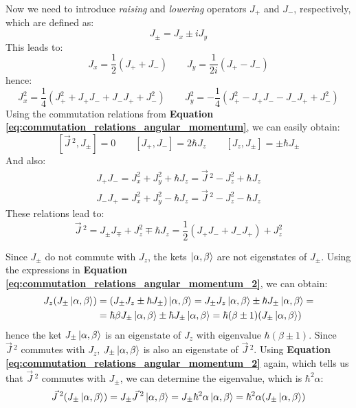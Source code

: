 Now we need to introduce \textit{raising} and \textit{lowering} operators $J_+$ and $J_-$, respectively, which are defined as:
\begin{equation}
    J_\pm = J_x \pm iJ_y
\end{equation}
This leads to:
\begin{equation} \label{eq:jx_and_jy_in_terms_of_jp_and_jm}
    J_x = \frac12(J_+ + J_-)\qquad J_y = \frac{1}{2i}(J_+ - J_-)
\end{equation}
hence:
\begin{equation}
    J_x^2 = \frac14(J_+^2+J_+J_-+J_-J_++J_-^2)\qquad J_y^2 = -\frac{1}{4}(J_+^2-J_+J_--J_-J_++J_-^2)
\end{equation}
Using the commutation relations from \textbf{Equation \ref{eq:commutation_relations_angular_momentum}}, we can easily obtain:
\begin{equation} \label{eq:commutation_relations_angular_momentum_2}
    [\vec{J}\,^2, J_\pm] = 0\qquad [J_+, J_-] = 2\hbar J_z \qquad [J_z, J_\pm] = \pm\hbar J_\pm
\end{equation}
And also:
\begin{equation} \label{j_p_and_j_m_products}
    \begin{split}
        J_+J_- = J_x^2 + J_y^2 + \hbar J_z = \vec{J}\,^2 - J_z^2 + \hbar J_z\\
        J_-J_+ = J_x^2 + J_y^2 - \hbar J_z = \vec{J}\,^2 - J_z^2 - \hbar J_z
    \end{split} 
\end{equation}
These relations lead to:
\begin{equation}
    \vec{J}\,^2 = J_\pm J_\mp + J_z^2 \mp \hbar J_z = \frac12(J_+ J_- + J_- J_+) + J_z^2
\end{equation}

Since $J_\pm$ do not commute with $J_z$, the kets $\ket{\alpha, \beta}$ are not eigenstates of $J_\pm$. Using the expressions in \textbf{Equation \ref{eq:commutation_relations_angular_momentum_2}}, we can obtain:
\begin{equation} \label{eq:jz_jpm_eigenstates}
    \begin{split}
        J_z(J_\pm\ket{\alpha, \beta}) &= (J_\pm J_z \pm \hbar J_\pm)\ket{\alpha, \beta} = J_\pm J_z \ket{\alpha, \beta} \pm \hbar J_\pm \ket{\alpha, \beta} = \\
        &= \hbar \beta J_\pm \ket{\alpha, \beta} \pm \hbar J_\pm \ket{\alpha, \beta} = \hbar(\beta \pm 1)(J_\pm\ket{\alpha, \beta})
    \end{split}
\end{equation} 
hence the ket $J_\pm\ket{\alpha, \beta}$ is an eigenstate of $J_z$ with eigenvalue $\hbar(\beta \pm 1)$. Since $\vec{J}\,^2$ commutes with $J_z$, $J_\pm\ket{\alpha, \beta}$ is also an eigenstate of $\vec{J}\,^2$. Using \textbf{Equation \ref{eq:commutation_relations_angular_momentum_2}} again, which tells us that $\vec{J}\,^2$ commutes with $J_\pm$, we can determine the eigenvalue, which is $\hbar^2\alpha$:
\begin{equation} \label{eq:j2_jpm_eigenstates}
    \vec{J}\,^2(J_\pm\ket{\alpha, \beta}) = J_\pm \vec{J}\,^2\ket{\alpha, \beta} = J_\pm \hbar^2\alpha \ket{\alpha, \beta} = \hbar^2\alpha(J_\pm \ket{\alpha, \beta})
\end{equation}

